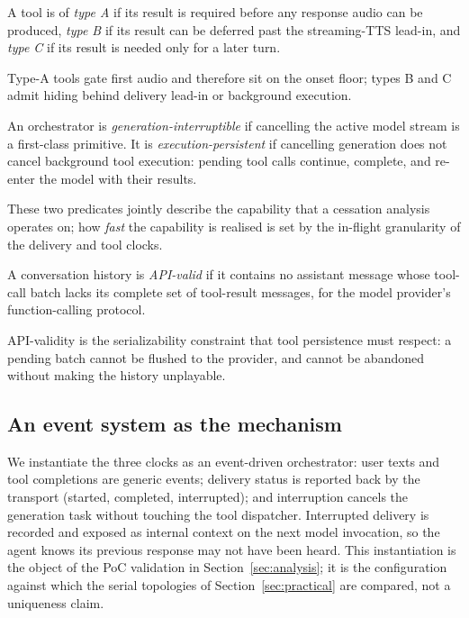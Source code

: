 \begin{definition}
\label{def:tool_typing}
A tool is of
\emph{type A} if its result is required before any response audio can be produced,
\emph{type B} if its result can be deferred past the streaming-TTS lead-in, and
\emph{type C} if its result is needed only for a later turn.
\end{definition}

Type-A tools gate first audio and therefore sit on the onset floor; types B and C admit
hiding behind delivery lead-in or background execution.

\begin{definition}[Interruptibility]
\label{def:interruptibility}
An orchestrator is \emph{generation-interruptible} if cancelling the active model stream is a
first-class primitive.
It is \emph{execution-persistent} if cancelling generation does not cancel background tool
execution: pending tool calls continue, complete, and re-enter the model with their results.
\end{definition}

These two predicates jointly describe the capability that a cessation analysis operates on;
how \emph{fast} the capability is realised is set by the in-flight granularity of the
delivery and tool clocks.

\begin{definition}
\label{def:apivalid}
A conversation history is \emph{API-valid} if it contains no assistant message whose tool-call
batch lacks its complete set of tool-result messages, for the model provider's function-calling
protocol.
\end{definition}

API-validity is the serializability constraint that tool persistence must respect: a pending
batch cannot be flushed to the provider, and cannot be abandoned without making the history
unplayable.

\subsection{An event system as the mechanism}
We instantiate the three clocks as an event-driven orchestrator: user texts and tool
completions are generic events; delivery status is reported back by the transport
(started, completed, interrupted); and interruption cancels the generation task without
touching the tool dispatcher.
Interrupted delivery is recorded and exposed as internal context on the next model
invocation, so the agent knows its previous response may not have been heard.
This instantiation is the object of the PoC validation in
Section~\ref{sec:analysis}; it is the configuration against which the serial topologies of
Section~\ref{sec:practical} are compared, not a uniqueness claim.
